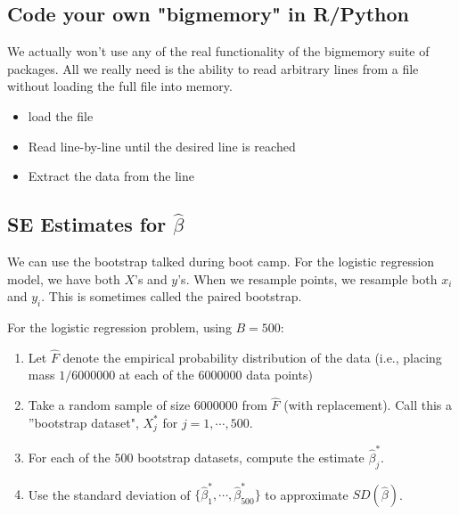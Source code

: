 \documentclass[11pt]{article}
\begin{document}
\subsection{Code your own "bigmemory" in R/Python}
We actually won't use any of the real functionality of the bigmemory suite of packages. All we really need is the ability to read arbitrary lines from a file without loading the full file into memory.
\begin{itemize}
  \item load the file
  \item Read line-by-line until the desired line is reached
  \item Extract the data from the line
\end{itemize}
\subsection{SE Estimates for $\hat{\beta}$}
We can use the bootstrap talked during boot camp.
For the logistic regression model, we have both $X$'s and $y$'s.
When we resample points, we resample both $x_i$ and $y_i$. This is sometimes called the paired bootstrap.

For the logistic regression problem, using $B=500$:
\begin{enumerate}
  \item Let $\hat{F}$ denote the empirical probability distribution of the data (i.e., placing mass $1/6000000$ at each of the $6000000$ data points)
  \item Take a random sample of size $6000000$ from $\hat{F}$ (with replacement). Call this a ''bootstrap dataset", $X_j^*$ for $j=1,\cdots,500$.
  \item For each of the $500$ bootstrap datasets, compute the estimate $\hat{\beta}_j^*$.
  \item Use the standard deviation of $\{\hat{\beta}_1^*,\cdots,\hat{\beta}_{500}^*\}$ to approximate $SD(\hat{\beta})$.
\end{enumerate}
\end{document}

